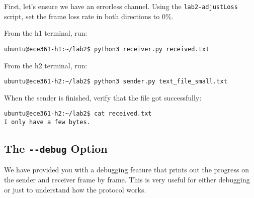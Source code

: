 \documentclass[11pt]{article}
\begin{document}
First, let's ensure we have an errorless channel. Using the \texttt{lab2-adjustLoss} script, set the frame loss rate in both directions to 0\%.

From the h1 terminal, run:
\begin{lstlisting}[style=ece361-shell-base, caption={}]
ubuntu@ece361-h1:~/lab2$ python3 receiver.py received.txt
\end{lstlisting}

From the h2 terminal, run:
\begin{lstlisting}[style=ece361-shell-base, caption={}]
ubuntu@ece361-h2:~/lab2$ python3 sender.py text_file_small.txt
\end{lstlisting}

When the sender is finished, verify that the file got successfully:
\begin{lstlisting}[style=ece361-shell-base, caption={}]
ubuntu@ece361-h2:~/lab2$ cat received.txt
I only have a few bytes.
\end{lstlisting}


\subsection {The \texttt{-{}-debug} Option}
We have provided you with a debugging feature that prints out the progress on the sender and receiver frame by frame.
This is very useful for either debugging or just to understand how the protocol works.
\end{document}
